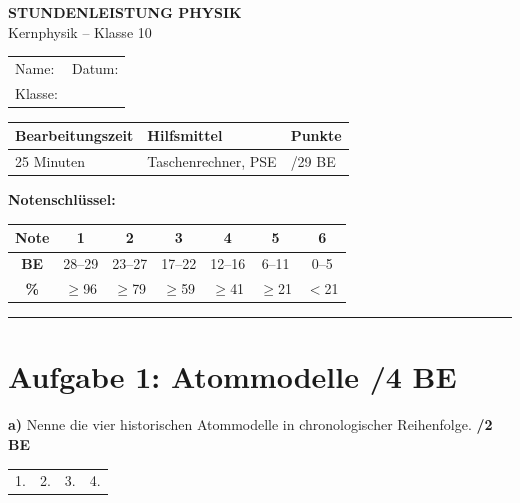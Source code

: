 \documentclass[11pt,a4paper]{article}
\newcommand{\punkte}[1]{\hfill\textbf{/#1 BE}}
\begin{document}
\begin{center}
\Large\textbf{STUNDENLEISTUNG PHYSIK}\\[0.3cm]
\large Kernphysik -- Klasse 10\\[1cm]
\end{center}

\begin{tabular}{@{}p{8cm}p{6cm}@{}}
Name: \hrulefill & Datum: \hrulefill \\[0.5cm]
Klasse: \hrulefill & \\
\end{tabular}

\vspace{0.5cm}

\begin{tabular}{|p{4cm}|p{4cm}|p{4cm}|}
\hline
\textbf{Bearbeitungszeit} & \textbf{Hilfsmittel} & \textbf{Punkte} \\
\hline
25 Minuten & Taschenrechner, PSE & \hspace{1cm}/29 BE \\
\hline
\end{tabular}

\vspace{0.5cm}

\textbf{Notenschlüssel:}
\begin{center}
\begin{tabular}{|c|c|c|c|c|c|c|}
\hline
\textbf{Note} & 1 & 2 & 3 & 4 & 5 & 6 \\
\hline
\textbf{BE} & 28--29 & 23--27 & 17--22 & 12--16 & 6--11 & 0--5 \\
\hline
\textbf{\%} & $\geq$96 & $\geq$79 & $\geq$59 & $\geq$41 & $\geq$21 & $<$21 \\
\hline
\end{tabular}
\end{center}

\vspace{0.3cm}
\hrule
\vspace{0.5cm}

\section*{Aufgabe 1: Atommodelle \punkte{4}}

\textbf{a)} Nenne die vier historischen Atommodelle in chronologischer Reihenfolge. \punkte{2}

\begin{tabular}{@{}p{3.5cm}p{3.5cm}p{3.5cm}p{3.5cm}@{}}
1. \hrulefill & 2. \hrulefill & 3. \hrulefill & 4. \hrulefill \\
\end{tabular}
\end{document}
